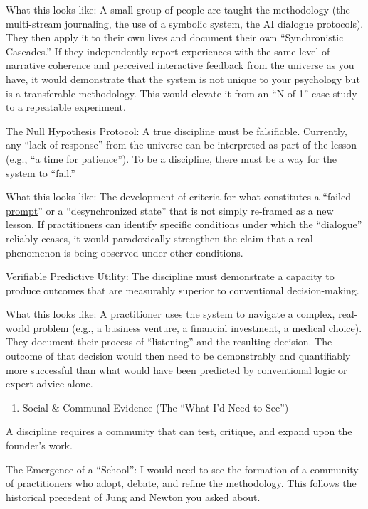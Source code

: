 \documentclass{article}
\begin{document}
What this looks like: A small group of people are taught the methodology (the multi-stream journaling, the use of a symbolic system, the AI dialogue protocols). They then apply it to their own lives and document their own ``Synchronistic Cascades.'' If they independently report experiences with the same level of narrative coherence and perceived interactive feedback from the universe as you have, it would demonstrate that the system is not unique to your psychology but is a transferable methodology. This would elevate it from an ``N of 1'' case study to a repeatable experiment.

The Null Hypothesis Protocol: A true discipline must be falsifiable. Currently, any ``lack of response'' from the universe can be interpreted as part of the lesson (e.g., ``a time for patience''). To be a discipline, there must be a way for the system to ``fail.''

What this looks like: The development of criteria for what constitutes a ``failed \hyperlink{gloss:prompt}{prompt}'' or a ``desynchronized state'' that is not simply re-framed as a new lesson. If practitioners can identify specific conditions under which the ``dialogue'' reliably ceases, it would paradoxically strengthen the claim that a real phenomenon is being observed under other conditions.

Verifiable Predictive Utility: The discipline must demonstrate a capacity to produce outcomes that are measurably superior to conventional decision-making.

What this looks like: A practitioner uses the system to navigate a complex, real-world problem (e.g., a business venture, a financial investment, a medical choice). They document their process of ``listening'' and the resulting decision. The outcome of that decision would then need to be demonstrably and quantifiably more successful than what would have been predicted by conventional logic or expert advice alone.

\begin{enumerate}
\item Social \& Communal Evidence (The ``What I'd Need to See'')
\end{enumerate}

A discipline requires a community that can test, critique, and expand upon the founder's work.

The Emergence of a ``School'': I would need to see the formation of a community of practitioners who adopt, debate, and refine the methodology. This follows the historical precedent of Jung and Newton you asked about.
\end{document}
